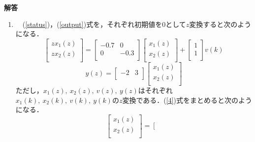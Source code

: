 \documentclass[a4paper,11pt]{jarticle}
\begin{document}
{\Large{\bf 解答}}
\begin{enumerate}
 \item 
\ \ (\ref{status})，(\ref{output})式を，それぞれ初期値を$ 0 $として$ z $変換すると次のようになる．
\begin{equation}
 \left[
  \begin{array}{c}
   z x_1(z) \\
   z x_2(z) \\
  \end{array}
 \right] = \left[
 \begin{array}{cc}
  -0.7 & 0 \\
  0 & -0.3 \\
 \end{array}
	   \right]
 \left[
  \begin{array}{c}
   x_1(z) \\
   x_2(z) \\
  \end{array}
 \right] + \left[
 \begin{array}{c}
  1 \\
  1 \\
 \end{array}
	   \right] v(k)
 \label{4}
\end{equation}
\begin{equation}
 y(z) = \left[
	 \begin{array}{cc}
	  -2 & 3 \\
	 \end{array}
	\right] \left[
	\begin{array}{c}
	 x_1(z) \\
	 x_2(z)\\
	\end{array}
		\right]
\label{5}
\end{equation}
ただし，$ x_1(z), ~ x_2(z), ~ v(z), ~ y(z) $はそれぞれ$ x_1(k), ~ x_2(k), ~ v(k), ~ y(k) $の$ z $変換である．(\ref{4})式をまとめると次のようになる．
\begin{equation}
 \left[
  \begin{array}{c}
   x_1(z) \\
   x_2(z) \\
  \end{array}
 \right] = \left[
 \begin{array}{cc}

\end{array}
\end{equation}
\end{enumerate}
\end{document}
